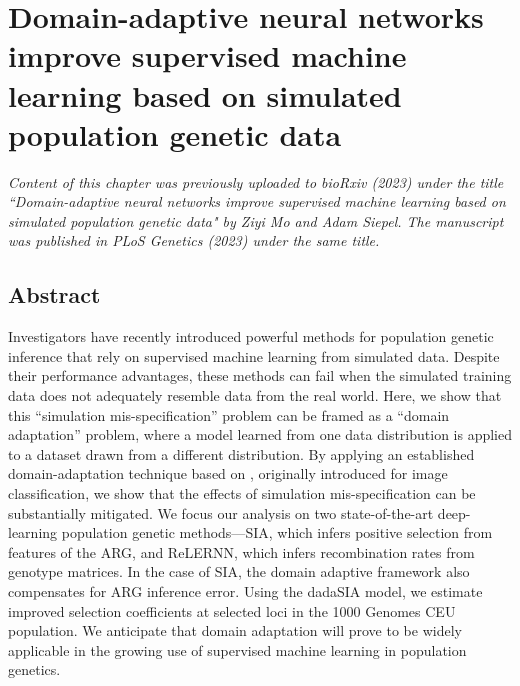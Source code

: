 \chapter{Domain-adaptive neural networks improve supervised machine learning based on simulated population genetic data} \label{chapter4}

\textit{Content of this chapter was previously uploaded to bioRxiv (2023) under the title ``Domain-adaptive neural networks improve supervised machine learning based on simulated population genetic data" by Ziyi Mo and Adam Siepel. The manuscript was published in PLoS Genetics (2023) under the same title.}

\section{Abstract}
Investigators have recently introduced powerful methods for population genetic inference that rely on supervised machine learning from simulated data. Despite their performance advantages, these methods can fail when the simulated training data does not adequately resemble data from the real world. Here, we show that this “simulation mis-specification” problem can be framed as a “domain adaptation” problem, where a model learned from one data distribution is applied to a dataset drawn from a different distribution. By applying an established domain-adaptation technique based on , originally introduced for image classification, we show that the effects of simulation mis-specification can be substantially mitigated. We focus our analysis on two state-of-the-art deep-learning population genetic methods—\ac{SIA}, which infers positive selection from features of the \acf{ARG}, and ReLERNN, which infers recombination rates from genotype matrices. In the case of \ac{SIA}, the domain adaptive framework also compensates for \ac{ARG} inference error. Using the \ac{dadaSIA} model, we estimate improved selection coefficients at selected loci in the 1000 Genomes CEU population. We anticipate that domain adaptation will prove to be widely applicable in the growing use of supervised machine learning in population genetics.

